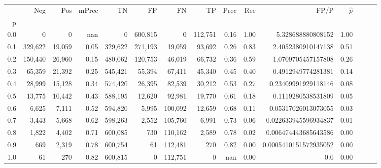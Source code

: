 \begin{tabular}{rrrrrrrrrrrrrrr}
\toprule
{} &      Neg &     Pos & mPrec &       TN &       FP &       FN &       TP &  Prec &   Rec &                   FP/P & $\hat{p}$ \\
p   &          &         &       &          &          &          &          &       &       &                        &           \\
\midrule
0.0 &        0 &       0 &   nan &        0 &  600,815 &        0 &  112,751 &  0.16 &  1.00 &      5.328688880808152 &      1.00 \\
0.1 &  329,622 &  19,059 &  0.05 &  329,622 &  271,193 &   19,059 &   93,692 &  0.26 &  0.83 &     2.4052380910147138 &      0.51 \\
0.2 &  150,440 &  26,960 &  0.15 &  480,062 &  120,753 &   46,019 &   66,732 &  0.36 &  0.59 &     1.0709705457157808 &      0.26 \\
0.3 &   65,359 &  21,392 &  0.25 &  545,421 &   55,394 &   67,411 &   45,340 &  0.45 &  0.40 &     0.4912949774281381 &      0.14 \\
0.4 &   28,999 &  15,128 &  0.34 &  574,420 &   26,395 &   82,539 &   30,212 &  0.53 &  0.27 &    0.23409991929118146 &      0.08 \\
0.5 &   13,775 &  10,442 &  0.43 &  588,195 &   12,620 &   92,981 &   19,770 &  0.61 &  0.18 &     0.1119280538531809 &      0.05 \\
0.6 &    6,625 &   7,111 &  0.52 &  594,820 &    5,995 &  100,092 &   12,659 &  0.68 &  0.11 &    0.05317026013073055 &      0.03 \\
0.7 &    3,443 &   5,668 &  0.62 &  598,263 &    2,552 &  105,760 &    6,991 &  0.73 &  0.06 &   0.022633945596934837 &      0.01 \\
0.8 &    1,822 &   4,402 &  0.71 &  600,085 &      730 &  110,162 &    2,589 &  0.78 &  0.02 &   0.006474443685643586 &      0.00 \\
0.9 &      669 &   2,319 &  0.78 &  600,754 &       61 &  112,481 &      270 &  0.82 &  0.00 &  0.0005410151572935052 &      0.00 \\
1.0 &       61 &     270 &  0.82 &  600,815 &        0 &  112,751 &        0 &   nan &  0.00 &                    0.0 &      0.00 \\
\bottomrule
\end{tabular}

